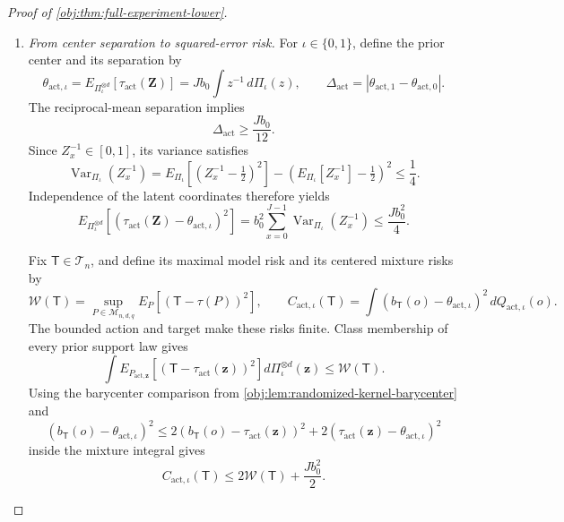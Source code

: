 \begin{proof}[Proof of \cref{obj:thm:full-experiment-lower}]
\begin{enumerate}
Equality of the atoms on \(\mathcal G\) implies equality of the probabilities
of \(\mathcal G\), and hence of its complement. For every augmented-sample
event \(\mathcal B\),
\[
\begin{aligned}
&\left|
\widetilde Q_{\mathrm{act},0}(\mathcal B)
-\widetilde Q_{\mathrm{act},1}(\mathcal B)
\right|\\
&\quad=
\left|
\widetilde Q_{\mathrm{act},0}(\mathcal B\cap\mathcal G^c)
-\widetilde Q_{\mathrm{act},1}(\mathcal B\cap\mathcal G^c)
\right|
\le\widetilde Q_{\mathrm{act},0}(\mathcal G^c).
\end{aligned}
\]
Applying this inequality to preimages under the forgetting map gives
\[
\operatorname{TV}(Q_{\mathrm{act},0},Q_{\mathrm{act},1})
\le
\operatorname{TV}(\widetilde Q_{\mathrm{act},0},
\widetilde Q_{\mathrm{act},1})
\le\frac18.
\]

\item \emph{From center separation to squared-error risk.}
For \(\iota\in\{0,1\}\), define the prior center and its separation by
\[
\theta_{\mathrm{act},\iota}
=E_{\Pi_\iota^{\otimes d}}[\tau_{\mathrm{act}}(\mathbf Z)]
=Jb_0\int z^{-1}\,d\Pi_\iota(z),
\qquad
\Delta_{\mathrm{act}}
=|\theta_{\mathrm{act},1}-\theta_{\mathrm{act},0}|.
\]
The reciprocal-mean separation implies
\[
\Delta_{\mathrm{act}}\ge\frac{Jb_0}{12}.
\]
Since \(Z_x^{-1}\in[0,1]\), its variance satisfies
\[
\operatorname{Var}_{\Pi_\iota}(Z_x^{-1})
=
E_{\Pi_\iota}\!\left[(Z_x^{-1}-\tfrac12)^2\right]
-\left(E_{\Pi_\iota}[Z_x^{-1}]-\tfrac12\right)^2
\le\frac14.
\]
Independence of the latent coordinates therefore yields
\[
E_{\Pi_\iota^{\otimes d}}\!\left[
(\tau_{\mathrm{act}}(\mathbf Z)-\theta_{\mathrm{act},\iota})^2
\right]
=
b_0^2\sum_{x=0}^{J-1}
\operatorname{Var}_{\Pi_\iota}(Z_x^{-1})
\le\frac{Jb_0^2}{4}.
\]

Fix \(\mathsf T\in\mathcal T_n\), and define its maximal model risk and its
centered mixture risks by
\[
\mathcal W(\mathsf T)
=
\sup_{P\in\mathcal M_{n,d,q}}
E_P[(\mathsf T-\tau(P))^2],
\qquad
C_{\mathrm{act},\iota}(\mathsf T)
=
\int
(b_{\mathsf T}(o)-\theta_{\mathrm{act},\iota})^2\,
dQ_{\mathrm{act},\iota}(o).
\]
The bounded action and target make these risks finite. Class membership of
every prior support law gives
\[
\int
E_{P_{\mathrm{act},\mathbf z}}\!\left[
(\mathsf T-\tau_{\mathrm{act}}(\mathbf z))^2
\right]
d\Pi_\iota^{\otimes d}(\mathbf z)
\le\mathcal W(\mathsf T).
\]
Using the barycenter comparison from
\cref{obj:lem:randomized-kernel-barycenter} and
\[
(b_{\mathsf T}(o)-\theta_{\mathrm{act},\iota})^2
\le
2(b_{\mathsf T}(o)-\tau_{\mathrm{act}}(\mathbf z))^2
+
2(\tau_{\mathrm{act}}(\mathbf z)-\theta_{\mathrm{act},\iota})^2
\]
inside the mixture integral gives
\[
C_{\mathrm{act},\iota}(\mathsf T)
\le2\mathcal W(\mathsf T)+\frac{Jb_0^2}{2}.
\]


\end{enumerate}
\end{proof}
